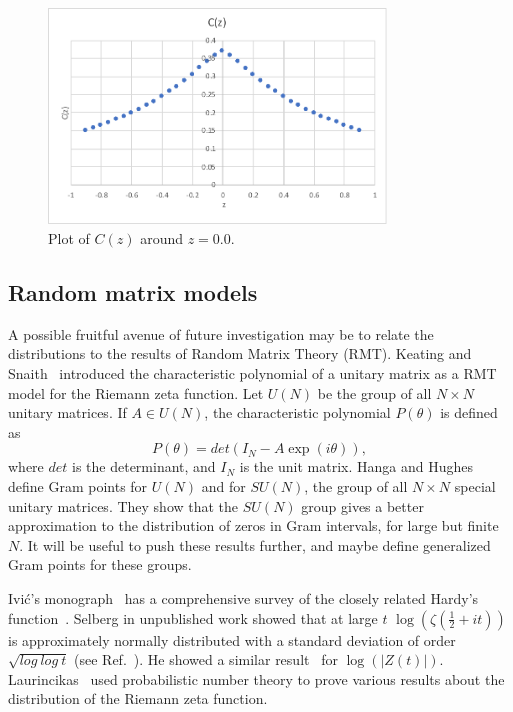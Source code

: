 \documentclass[twoside]{article}
\begin{document}
\begin{figure}
\centering
\includegraphics[width=0.8\textwidth]{Cz.pdf}
\caption[]{ 
 Plot of $C(z)$ around $z=0.0$. 
  }
\vspace{1mm}
\label{Cz}
\end{figure}


\subsection{\label{related}Random matrix models}
A possible fruitful avenue of future investigation may be to relate the distributions to 
the results of Random Matrix Theory (RMT).  Keating and  Snaith~\cite{Keating 2000a} introduced the 
characteristic polynomial of a unitary matrix as a RMT model for the Riemann zeta function. 
Let $U(N)$ be the group of  all $N \times N$ unitary matrices.
If $A \in U(N)$, the characteristic polynomial $P(\theta)$ is defined as
\begin{equation}
P(\theta) = det(I_N-A\exp {(i\theta)}),
\label{eq:uNeigen}
\end{equation}
where $det$ is the determinant, and $I_N$ is the unit matrix.
Hanga and Hughes~\cite{Hanga 2020} define Gram points for  $U(N)$ and 
for $SU(N)$, the group of 
all $N \times N$ special unitary matrices. They show that the $SU(N)$ group gives
a better approximation to the distribution of zeros in Gram intervals, for large but
finite $N$. It will be useful to push these results further, and maybe define 
generalized Gram points for these groups.

Ivi\'c's monograph~\cite{Ivic 2013} 
has a comprehensive survey of  the  closely related Hardy's function~\cite{Hardy 1918}.
Selberg in unpublished work showed that at large $t$ $\log (\zeta(\frac{1}{2} + it))$ is 
approximately normally distributed with a standard deviation of 
order $\sqrt{log~log~t}$ (see Ref.~\cite{Hejhal}). He showed a 
similar result~\cite{Selberg 1989, Selberg 1991} for $\log (|Z(t)|)$. 
Laurincikas~\cite{Laurincikas}  used probabilistic number theory to prove various results 
about the distribution of the Riemann zeta function.
\end{document}
